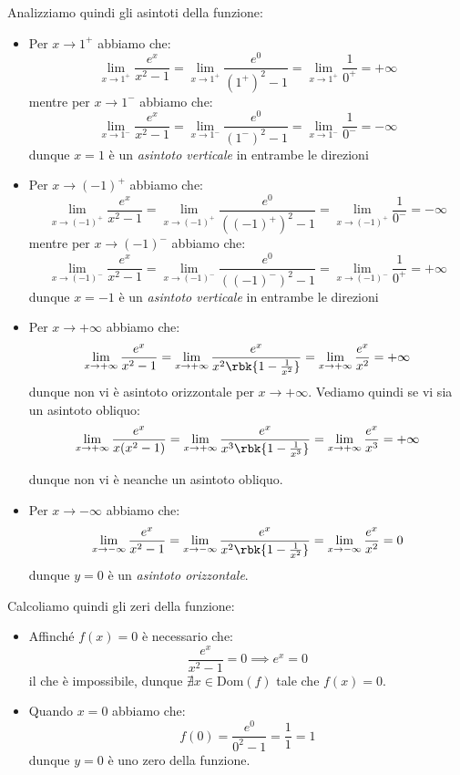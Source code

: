\documentclass[a4paper, 12pt]{report}
\begin{document}
    Analizziamo quindi gli asintoti della funzione:
    \begin{itemize}
        \item Per $x \to 1^+$ abbiamo che:
        \[\lim_{x \to 1^+} \frac{e^x}{x^2-1} = \lim_{x \to 1^+} \frac{e^0}{(1^+)^2-1} = \lim_{x \to 1^+} \frac{1}{0^+} = +\infty\]
        mentre per $x \to 1^-$ abbiamo che:
        \[\lim_{x \to 1^-} \frac{e^x}{x^2-1} = \lim_{x \to 1^-} \frac{e^0}{(1^-)^2-1} = \lim_{x \to 1^-} \frac{1}{0^-} = -\infty\]
        dunque $x = 1$ è un \textit{asintoto verticale} in entrambe le direzioni

        \item Per $x \to (-1)^+$ abbiamo che:
        \[\lim_{x \to (-1)^+} \frac{e^x}{x^2-1} = \lim_{x \to (-1)^+} \frac{e^0}{((-1)^+)^2-1} = \lim_{x \to (-1)^+} \frac{1}{0^-} = -\infty\]
        mentre per $x \to(-1)^-$ abbiamo che:
        \[\lim_{x \to(-1)^-} \frac{e^x}{x^2-1} = \lim_{x \to(-1)^-} \frac{e^0}{((-1)^-)^2-1} = \lim_{x \to(-1)^-} \frac{1}{0^+} = +\infty\]
        dunque $x = -1$ è un \textit{asintoto verticale} in entrambe le direzioni

        \item Per $x \to +\infty$ abbiamo che:
        \[\lim_{x \to +\infty} \frac{e^x}{x^2-1} = \lim_{x \to +\infty} \frac{e^x}{x^2 \rbk{1-\frac{1}{x^2}}} = \lim_{x \to +\infty} \frac{e^x}{x^2} = +\infty\]
        dunque non vi è asintoto orizzontale per $x \to +\infty$. Vediamo quindi se vi sia un asintoto obliquo:
        \[\lim_{x \to +\infty} \frac{e^x}{x(x^2-1)} = \lim_{x \to +\infty} \frac{e^x}{x^3 \rbk{1-\frac{1}{x^3}}} = \lim_{x \to +\infty} \frac{e^x}{x^3} = +\infty\]

        dunque non vi è neanche un asintoto obliquo.

        \item Per $x \to -\infty$ abbiamo che:
        \[\lim_{x \to -\infty} \frac{e^x}{x^2-1} = \lim_{x \to -\infty} \frac{e^x}{x^2 \rbk{1-\frac{1}{x^2}}} = \lim_{x \to -\infty} \frac{e^x}{x^2} = 0\]
        dunque $y = 0$ è un \textit{asintoto orizzontale}.
    \end{itemize}

    Calcoliamo quindi gli zeri della funzione:
    \begin{itemize}
        \item Affinché $f(x) = 0$ è necessario che:
        \[\frac{e^x}{x^2-1} = 0 \implies e^x = 0 \]
        il che è impossibile, dunque $\nexists x \in \mathrm{Dom}(f)$ tale che $f(x) = 0$.
        \item Quando $x = 0$ abbiamo che:
        \[f(0) =  \frac{e^0}{0^2-1} = \frac{1}{1} = 1\]
        dunque $y = 0$ è uno zero della funzione.
    \end{itemize}
    
\end{document}
